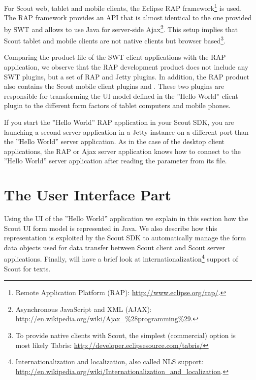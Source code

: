\documentclass[a4paper,10pt,twoside]{book}
\begin{document}
For Scout web, tablet and  mobile clients, the Eclipse RAP framework\footnote{
Remote Application Platform (RAP): \url{http://www.eclipse.org/rap/}.
}
is used.
The RAP framework provides an API that is almost identical to the one provided by SWT and allows to use Java for server-side Ajax\footnote{
Asynchronous JavaScript and XML (AJAX): \url{http://en.wikipedia.org/wiki/Ajax_\%28programming\%29}.
}.
This setup implies that Scout tablet and mobile clients are not native clients but browser based\footnote{
To provide native clients with Scout, the simplest (commercial) option is most likely Tabris: \url{http://developer.eclipsesource.com/tabris/}
}.

Comparing the product file of the SWT client applications with the RAP application, we observe that the RAP development product does not include any SWT plugins, but a set of RAP and Jetty plugins.
In addition, the RAP product also contains the Scout mobile client plugins  and .
These two plugins are responsible for transforming the UI model defined in the ''Hello World'' client plugin to the different form factors of tablet computers and mobile phones.

If you start the ''Hello World'' RAP application in your Scout SDK, you are launching a second server application in a Jetty instance on a different port than the ''Hello World'' server application.
As in the case of the desktop client applications, the RAP or Ajax server application knows how to connect to the ''Hello World'' server application after reading the parameter  from its  file.

\section{The User Interface Part}

Using the UI of the ''Hello World'' application we explain in this section how the Scout UI form model is represented in Java. 
We also describe how this representation is exploited by the Scout SDK to automatically manage the form data objects used for data transfer between Scout client and Scout server applications.
Finally, will have a brief look at internationalization\footnote{
Internationalization and localization, also called NLS support: \url{http://en.wikipedia.org/wiki/Internationalization_and_localization}.
} 
support of Scout for texts.
\end{document}
